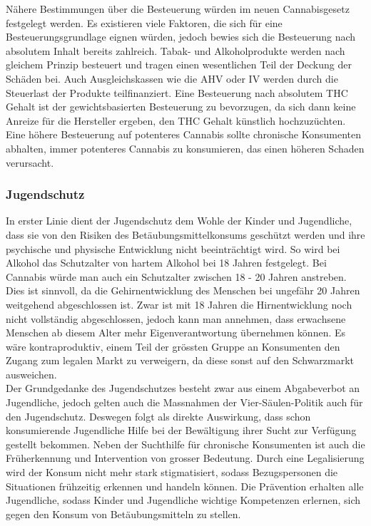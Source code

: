 \documentclass[../main.tex]{subfiles}
\begin{document}
	 \noindent
	 Nähere Bestimmungen über die Besteuerung würden im neuen Cannabisgesetz festgelegt werden.
	 Es existieren viele Faktoren, die sich für eine Besteuerungsgrundlage eignen würden, jedoch bewies sich die Besteuerung nach absolutem Inhalt bereits zahlreich.
	 Tabak- und Alkoholprodukte werden nach gleichem Prinzip besteuert und tragen einen wesentlichen Teil der Deckung der Schäden bei.
	 Auch Ausgleichskassen wie die AHV oder IV werden durch die Steuerlast der Produkte teilfinanziert.
	 Eine Besteuerung nach absolutem THC Gehalt ist der gewichtsbasierten Besteuerung zu bevorzugen, da sich dann keine Anreize für die Hersteller ergeben, den THC Gehalt künstlich hochzuzüchten.
	 Eine höhere Besteuerung auf potenteres Cannabis sollte chronische Konsumenten abhalten, immer potenteres Cannabis zu konsumieren, das einen höheren Schaden verursacht. 
	 
	 \subsubsection{Jugendschutz}
	 In erster Linie dient der Jugendschutz dem Wohle der Kinder und Jugendliche, dass sie von den Risiken des Betäubungsmittelkonsums geschützt werden und ihre psychische und physische Entwicklung nicht beeinträchtigt wird. 
	 So wird bei Alkohol das Schutzalter von hartem Alkohol bei 18 Jahren festgelegt. 
	 Bei Cannabis würde man auch ein Schutzalter zwischen 18 - 20 Jahren anstreben. 
	 Dies ist sinnvoll, da die Gehirnentwicklung des Menschen bei ungefähr 20 Jahren weitgehend abgeschlossen ist. 
	 Zwar ist mit 18 Jahren die Hirnentwicklung noch nicht vollständig abgeschlossen, jedoch kann man annehmen, dass erwachsene Menschen ab diesem Alter mehr Eigenverantwortung übernehmen können. 
	 Es wäre kontraproduktiv, einem Teil der grössten Gruppe an Konsumenten den Zugang zum legalen Markt zu verweigern, da diese sonst auf den Schwarzmarkt ausweichen. \\
	 
	 \noindent
	 Der Grundgedanke des Jugendschutzes besteht zwar aus einem Abgabeverbot an Jugendliche, jedoch gelten auch die Massnahmen der Vier-Säulen-Politik auch für den Jugendschutz. 
	 Deswegen folgt als direkte Auswirkung, dass schon konsumierende Jugendliche Hilfe bei der Bewältigung ihrer Sucht zur Verfügung gestellt bekommen. 
	 Neben der Suchthilfe für chronische Konsumenten ist auch die Früherkennung und Intervention von grosser Bedeutung. 
	 Durch eine Legalisierung wird der Konsum nicht mehr stark stigmatisiert, sodass Bezugspersonen die Situationen frühzeitig erkennen und handeln können. 
	 Die Prävention erhalten alle Jugendliche, sodass Kinder und Jugendliche wichtige Kompetenzen erlernen, sich gegen den Konsum von Betäubungsmitteln zu stellen.  
	 
\end{document}
